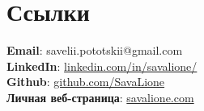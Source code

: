 \documentclass[a4paper,11pt]{article}
\begin{document}
\section{Ссылки}
\begin{itemize}[leftmargin=0.15in, label={}]
    \normalsize{\item{
                    \textbf{Email}{:  savelii.pototskii@gmail.com} \\
                    \textbf{LinkedIn}{:  \href{https://linkedin.com/in/savalione/}{linkedin.com/in/savalione/}} \\
                    \textbf{Github}{:  \href{https://github.com/SavaLione}{github.com/SavaLione}} \\
                    \textbf{Личная веб-страница}{: \href{https://savalione.com}{savalione.com} } \\
              }}
\end{itemize}

\end{document}

